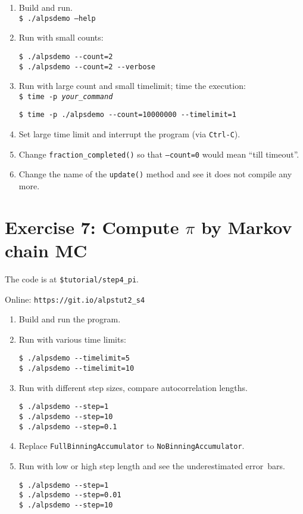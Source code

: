 \documentclass[12pt]{article}
\newcommand{\code}[1]{\texttt{#1}}
\begin{document}
\begin{enumerate}
\item Build and run.\\
\code{\$ ./alpsdemo --help}
\item Run with small counts:
\begin{lstlisting}[]
$ ./alpsdemo --count=2
$ ./alpsdemo --count=2 --verbose
\end{lstlisting}
\item Run with large count and small timelimit; time the execution:\\
\code{\$ time -p \emph{your\_command}}
\begin{lstlisting}[emph={time}]
$ time -p ./alpsdemo --count=10000000 --timelimit=1
\end{lstlisting}%
\item Set large time limit and interrupt the program (via \code{Ctrl-C}).
\item Change \code{fraction\_completed()} so that \code{--count=0} would mean ``till timeout''.
\item Change the name of the \code{update()} method and see it does not compile any more.
\end{enumerate}

\section*{Exercise 7: Compute $\pi$ by Markov chain MC}

The code is at \texttt{\color{ballblue}\$tutorial/step4\_pi}.

Online: \nolinkurl{https://git.io/alpstut2_s4}

\begin{enumerate}
\item Build and run the program.
\item Run with various time limits:
  \begin{lstlisting}
$ ./alpsdemo --timelimit=5
$ ./alpsdemo --timelimit=10
  \end{lstlisting}
\item Run with different step sizes, compare autocorrelation lengths.
  \begin{lstlisting}
$ ./alpsdemo --step=1 
$ ./alpsdemo --step=10
$ ./alpsdemo --step=0.1
  \end{lstlisting} %
\item Replace \code{FullBinningAccumulator} to 
\code{NoBinningAccumulator}.
\item Run with low or high step length and see the underestimated error~bars.
  \begin{lstlisting}
$ ./alpsdemo --step=1
$ ./alpsdemo --step=0.01
$ ./alpsdemo --step=10
  \end{lstlisting} %
\end{enumerate}
\end{document}
